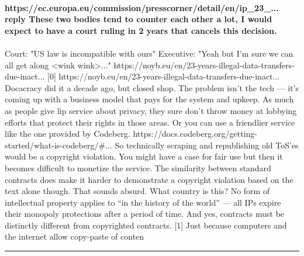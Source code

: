 \documentclass[10pt,a4paper]{article}
\begin{document}
\begin{multicols*}{2}
\paragraph{}
\textbf{https://ec.europa.eu/commission/presscorner/detail/en/ip\_23\_...
reply
These two bodies tend to counter each other a lot, I would expect to have a court ruling in 2 years that cancels this decision.}
\paragraph{}

Court: "US law is incompatible with ours"
Executive: "Yeah but I'm sure we can all get along <wink wink>..."
https://noyb.eu/en/23-years-illegal-data-transfers-due-inact...
[0] https://noyb.eu/en/23-years-illegal-data-transfers-due-inact...
Docacracy did it a decade ago, but closed shop.
The problem isn’t the tech — it’s coming up with a business model that pays for the system and upkeep. As much as people give lip service about privacy, they sure don’t throw money at lobbying efforts that protect their rights in those areas.
Or you can use a friendlier service like the one provided by Codeberg.
https://docs.codeberg.org/getting-started/what-is-codeberg/\#...
So technically scraping and republishing old ToS'es would be a copyright violation. You might have a case for fair use but then it becomes difficult to monetize the service.
The similarity between standard contracts does make it harder to demonstrate a copyright violation based on the text alone though.
That sounds absurd. What country is this?
No form of intellectual property applies to “in the history of the world” — all IPs expire their monopoly protections after a period of time.
And yes, contracts must be distinctly different from copyrighted contracts. [1] Just because computers and the internet allow copy-paste of conten
\par\noindent\textcolor{red}{\rule{\linewidth}{0.2mm}}
\vfill
\null
\noindent\begin{minipage}{\linewidth}

\end{minipage}
\end{multicols*}
\end{document}
